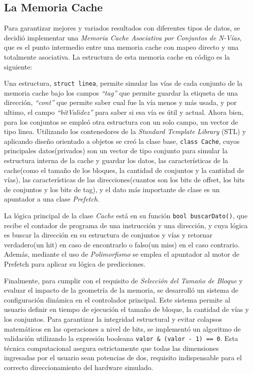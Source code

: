 \documentclass[12pt, a4paper]{article}
\begin{document}
\subsection{La Memoria Cache}
Para garantizar mejores y variados resultados con diferentes tipos de datos, se decidió implementar una \textit{Memoria Cache Asociativa por Conjuntos de N-Vías}, que es el punto intermedio entre una memoria cache con mapeo directo y una totalmente asociativa. La estructura de esta memoria cache en código es la siguiente:

Una estructura,  \lstinline |struct linea|, permite simular las vías de cada conjunto de la memoria cache bajo los campos \textit{``tag''} que permite guardar la etiqueta de una dirección, \textit{``cont''} que permite saber cual fue la vía menos y más usada, y por ultimo, el campo \textit{``bitValidez''} para saber si esa vía es útil y actual. Ahora bien, para los conjuntos se empleó otra estructura con un solo campo, un vector de tipo linea. Utilizando los contenedores de la \textit{Standard Template Library} (STL) y aplicando diseño orientado a objetos se creó la clase base, \lstinline|class Cache|, cuyos principales datos(privados) son un vector de tipo conjunto para simular la estructura interna de la cache y guardar los datos, las características de la cache(como el tamaño de los bloques, la cantidad de conjuntos y la cantidad de vías), las características de las direcciones(cuantos son los bits de offset, los bits de conjuntos y los bits de tag), y el dato más importante de clase es un apuntador a una clase \textit{Prefetch}.

La lógica principal de la clase \textit{Cache} está en su función \lstinline|bool buscarDato()|, que recibe el contador de programa de una instrucción y una dirección, y cuya lógica es buscar la dirección en su estructura de conjuntos y vías y retornar verdadero(un hit) en caso de encontrarlo o falso(un miss) en el caso contrario. Además, mediante el uso de \textit{Polimorfismo} se emplea el apuntador al motor de Prefetch para aplicar su lógica de predicciones.

Finalmente, para cumplir con el requisito de \textit{Selección del Tamaño de Bloque} y evaluar el impacto de la geometría de la memoria, se desarrolló un sistema de configuración dinámica en el controlador principal. Este sistema permite al usuario definir en tiempo de ejecución el tamaño de bloque, la cantidad de vías y los conjuntos. Para garantizar la integridad estructural y evitar colapsos matemáticos en las operaciones a nivel de bits, se implementó un algoritmo de validación utilizando la expresión booleana \lstinline|valor & (valor - 1) == 0|. Esta técnica computacional asegura estrictamente que todas las dimensiones ingresadas por el usuario sean potencias de dos, requisito indispensable para el correcto direccionamiento del hardware simulado.
\end{document}
